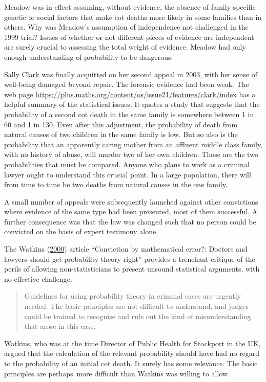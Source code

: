 \documentclass[
  10pt,
  b5paper]{book}
\begin{document}
Meadow was in effect assuming, without evidence, the
absence of family-specific genetic or social factors that
make cot deaths more likely in some families than in others.
Why was Meadow's assumption of independence not challenged
in the 1999 trial? Issues of whether or not different pieces
of evidence are independent are surely crucial to assessing
the total weight of evidence. Meadow had only enough
understanding of probability to be dangerous.

Sally Clark was finally acquitted on her second appeal in
2003, with her sense of well-being damaged beyond repair.
The forensic evidence had been weak. The web page
\url{https://plus.maths.org/content/os/issue21/features/clark/index}
has a helpful summary of the statistical issues. It
quotes a study that suggests that the probability of a
second cot death in the same family is somewhere between 1
in 60 and 1 in 130. Even after this adjustment, the
probability of death from natural causes of two children in
the same family is low. But so also is the probability that
an apparently caring mother from an affluent middle class
family, with no history of abuse, will murder two of her own
children. Those are the two probabilities that must be
compared. Anyone who plans to work as a criminal lawyer
ought to understand this crucial point. In a
large population, there will from time to time be two deaths
from natural causes in the one family.

A small number of appeals were subsequently launched against
other convictions where evidence of the same type had been
presented, most of them successful. A further consequence
was that the law was changed such that no person could be
convicted on the basis of expert testimony alone.

The Watkins (\protect\hyperlink{ref-watkins2000conviction}{2000}) article ``Conviction by mathematical
error?: Doctors and lawyers should get probability theory right''
provides a trenchant critique of the perils of allowing
non-statisticians to present unsound statistical arguments, with
no effective challenge.

\begin{quote}
Guidelines for using probability theory in criminal cases are urgently needed. The basic principles are not difficult to understand, and judges could be trained to recognise and rule out the kind of misunderstanding that arose in this case.
\end{quote}

Watkins, who was at the time Director of Public Health for Stockport
in the UK, argued that the calculation of the relevant probability
should have had no regard to the probability of an initial cot death.
It surely has some relevance. The basic principles are perhaps~more
difficult than Watkins was willing to allow.
\end{document}
